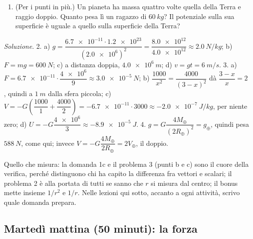 \documentclass[11pt]{report}
\begin{document}
\begin{enumerate}
  \begin{enumerate}[label=\alph*)]
    \item Con che forza si attraggono?
    \item In quale punto fra le due il campo gravitazionale totale è nullo?
    \item Quanto vale il potenziale gravitazionale in quel punto?
    \item Quanto vale l'energia potenziale gravitazionale delle due sfere?
  \end{enumerate}
  \item[4.] (Per i punti in più.) Un pianeta ha massa quattro volte quella
  della Terra e raggio doppio. Quanto pesa lì un ragazzo di $\SI{60}{kg}$?
  Il potenziale sulla sua superficie è uguale a quello sulla superficie
  della Terra?
\end{enumerate}

\emph{Soluzione.}
2. a) $g = \dfrac{\num{6.7e-11} \cdot \num{1.2e23}}{(\num{2.0e6})^2} =
\dfrac{\num{8.0e12}}{\num{4.0e12}} \approx \SI{2.0}{N/kg}$;
b) $F = mg = \SI{600}{N}$; c) a distanza doppia, $\SI{4.0e6}{m}$;
d) $v = gt = \SI{6}{m/s}$.
3. a) $F = \num{6.7e-11} \cdot \dfrac{\num{4e6}}{9} \approx
\SI{3.0e-5}{N}$; b) $\dfrac{1000}{x^2} = \dfrac{4000}{(3-x)^2}$ dà
$\dfrac{3-x}{x} = 2$, quindi a $\SI{1}{m}$ dalla sfera piccola;
c) $V = -G\left(\dfrac{1000}{1} + \dfrac{4000}{2}\right) =
-\num{6.7e-11} \cdot 3000 \approx \SI{-2.0e-7}{J/kg}$, per niente zero;
d) $U = -G\dfrac{\num{4e6}}{3} \approx \SI{-8.9e-5}{J}$.
4. $g = G\dfrac{4M_\oplus}{(2R_\oplus)^2} = g_\oplus$, quindi pesa
$\SI{588}{N}$, come qui; invece $V = -G\dfrac{4M_\oplus}{2R_\oplus} =
2V_\oplus$, il doppio.

Quello che misura: la domanda 1c e il problema 3 (punti b e c) sono il
cuore della verifica, perché distinguono chi ha capito la differenza fra
vettori e scalari; il problema 2 è alla portata di tutti se sanno che $r$ si
misura dal centro; il bonus mette insieme $1/r^2$ e $1/r$. Nelle lezioni
qui sotto, accanto a ogni attività, scrivo quale domanda prepara.

\subsection*{Martedì mattina (50 minuti): la forza}
\end{document}
